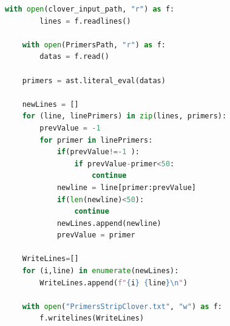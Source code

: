 \begin{lstlisting}[language=Python, caption={Stripping primers from Clover input}, label={lst:python-strip-primers}]
    with open(clover_input_path, "r") as f:
        lines = f.readlines()

    with open(PrimersPath, "r") as f:
        datas = f.read()

    primers = ast.literal_eval(datas)

    newLines = []
    for (line, linePrimers) in zip(lines, primers):
        prevValue = -1
        for primer in linePrimers:
            if(prevValue!=-1 ):
                if prevValue-primer<50:
                    continue
            newline = line[primer:prevValue]
            if(len(newline)<50):
                continue
            newLines.append(newline)
            prevValue = primer

    WriteLines=[]
    for (i,line) in enumerate(newLines):
        WriteLines.append(f"{i} {line}\n")

    with open("PrimersStripClover.txt", "w") as f:
        f.writelines(WriteLines)
\end{lstlisting}